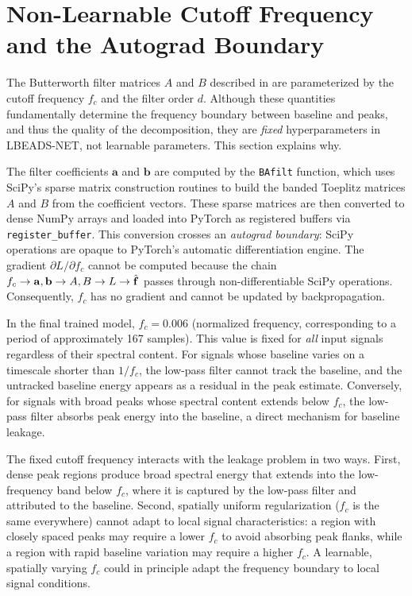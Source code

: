 \section{Non-Learnable Cutoff Frequency and the Autograd Boundary}
\label{sec:method_fc}

The Butterworth filter matrices $A$ and $B$ described in  are parameterized by the cutoff frequency $f_c$ and the filter order $d$. Although these quantities fundamentally determine the frequency boundary between baseline and peaks, and thus the quality of the decomposition, they are \emph{fixed} hyperparameters in LBEADS-NET, not learnable parameters. This section explains why.

The filter coefficients $\mathbf{a}$ and $\mathbf{b}$ are computed by the \texttt{BAfilt} function, which uses SciPy's sparse matrix construction routines to build the banded Toeplitz matrices $A$ and $B$ from the coefficient vectors. These sparse matrices are then converted to dense NumPy arrays and loaded into PyTorch as registered buffers via \texttt{register\_buffer}. This conversion crosses an \emph{autograd boundary}: SciPy operations are opaque to PyTorch's automatic differentiation engine. The gradient $\partial L / \partial f_c$ cannot be computed because the chain $f_c \to \mathbf{a}, \mathbf{b} \to A, B \to L \to \hat{\mathbf{f}}$ passes through non-differentiable SciPy operations. Consequently, $f_c$ has no gradient and cannot be updated by backpropagation.

In the final trained model, $f_c = 0.006$ (normalized frequency, corresponding to a period of approximately 167 samples). This value is fixed for \emph{all} input signals regardless of their spectral content. For signals whose baseline varies on a timescale shorter than $1/f_c$, the low-pass filter cannot track the baseline, and the untracked baseline energy appears as a residual in the peak estimate. Conversely, for signals with broad peaks whose spectral content extends below $f_c$, the low-pass filter absorbs peak energy into the baseline, a direct mechanism for baseline leakage.

The fixed cutoff frequency interacts with the leakage problem in two ways. First, dense peak regions produce broad spectral energy that extends into the low-frequency band below $f_c$, where it is captured by the low-pass filter and attributed to the baseline. Second, spatially uniform regularization ($f_c$ is the same everywhere) cannot adapt to local signal characteristics: a region with closely spaced peaks may require a lower $f_c$ to avoid absorbing peak flanks, while a region with rapid baseline variation may require a higher $f_c$. A learnable, spatially varying $f_c$ could in principle adapt the frequency boundary to local signal conditions.

